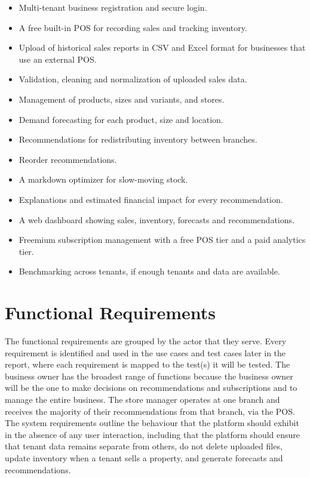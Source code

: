 \documentclass{StockSense}
\begin{document}
\begin{itemize}
    \item Multi-tenant business registration and secure login.
    \item A free built-in POS for recording sales and tracking inventory.
    \item Upload of historical sales reports in CSV and Excel format for businesses that use an external POS.
    \item Validation, cleaning and normalization of uploaded sales data.
    \item Management of products, sizes and variants, and stores.
    \item Demand forecasting for each product, size and location.
    \item Recommendations for redistributing inventory between branches.
    \item Reorder recommendations.
    \item A markdown optimizer for slow-moving stock.
    \item Explanations and estimated financial impact for every recommendation.
    \item A web dashboard showing sales, inventory, forecasts and recommendations.
    \item Freemium subscription management with a free POS tier and a paid analytics tier.
    \item Benchmarking across tenants, if enough tenants and data are available.
\end{itemize}

\section{Functional Requirements}

The functional requirements are grouped by the actor that they serve. Every requirement is identified and used in the use cases and test cases later in the report, where each requirement is mapped to the test(s) it will be tested. The business owner has the broadest range of functions because the business owner will be the one to make decisions on recommendations and subscriptions and to manage the entire business. The store manager operates at one branch and receives the majority of their recommendations from that branch, via the POS. The system requirements outline the behaviour that the platform should exhibit in the absence of any user interaction, including that the platform should ensure that tenant data remains separate from others, do not delete uploaded files, update inventory when a tenant sells a property, and generate forecasts and recommendations.
\end{document}
